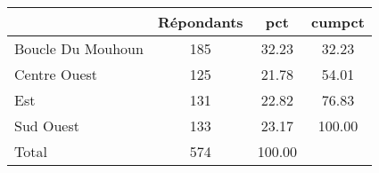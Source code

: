 {
\def\sym#1{\ifmmode^{#1}\else\(^{#1}\)\fi}
\begin{tabular}{l*{1}{ccc}}
\hline\hline
            & Répondants&         pct&      cumpct\\
\hline
Boucle Du Mouhoun&         185&       32.23&       32.23\\
Centre Ouest&         125&       21.78&       54.01\\
Est         &         131&       22.82&       76.83\\
Sud Ouest   &         133&       23.17&      100.00\\
Total       &         574&      100.00&            \\
\hline\hline
\end{tabular}
}
